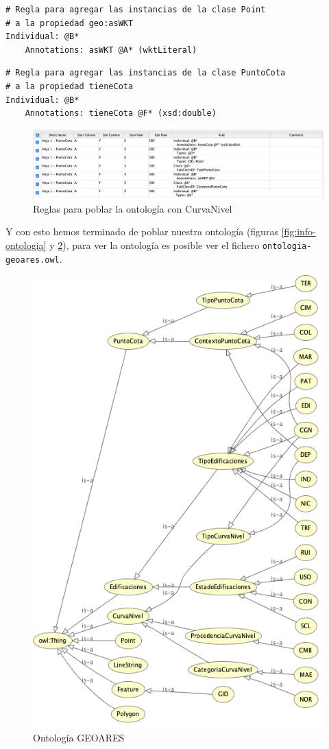 

\begin{lstlisting}
# Regla para agregar las instancias de la clase Point
# a la propiedad geo:asWKT 
Individual: @B*
	Annotations: asWKT @A* (wktLiteral)
\end{lstlisting}

\begin{lstlisting}
# Regla para agregar las instancias de la clase PuntoCota
# a la propiedad tieneCota
Individual: @B*
	Annotations: tieneCota @F* (xsd:double)
\end{lstlisting}



\begin{figure}[H]
	\centering
	\includegraphics[width=1\linewidth]{imagenes/capitulo5/reglas-puntocota}
	\caption{Reglas para poblar la ontología con CurvaNivel}
	\label{fig:reglas-puntocota}
\end{figure}

Y con esto hemos terminado de poblar nuestra ontología (figuras \ref{fig:info-ontologia} y \ref{fig:ontologia-final}), para ver la ontología es posible ver el fichero \texttt{ontologia-geoares.owl}.



\begin{figure}[H]
	\centering
	\includegraphics[width=0.6\linewidth]{imagenes/capitulo5/ontologia-final}
	\caption{Ontología GEOARES}
	\label{fig:ontologia-final}
\end{figure}

